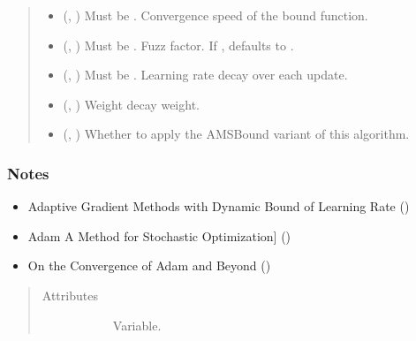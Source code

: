 \documentclass[letterpaper,10pt,english]{sphinxmanual}
\begin{document}
\begin{fulllineitems}
\begin{quote}
\begin{description}
\begin{itemize}
\item {} 
 (, ) \textendash{} Must be . Convergence speed of the bound function.

\item {} 
 (, ) \textendash{} Must be . Fuzz factor. If , defaults to .

\item {} 
 (, ) \textendash{} Must be . Learning rate decay over each update.

\item {} 
 (, ) \textendash{} Weight decay weight.

\item {} 
 (, ) \textendash{} Whether to apply the AMSBound variant of this algorithm.

\end{itemize}

\end{description}\end{quote}
\subsubsection*{Notes}
\begin{itemize}
\item {} 
Adaptive Gradient Methods with Dynamic Bound of Learning Rate ()

\item {} 
Adam \sphinxhyphen{} A Method for Stochastic Optimization{]} ()

\item {} 
On the Convergence of Adam and Beyond ()

\end{itemize}
\begin{quote}\begin{description}
\item[{Attributes}] \leavevmode\begin{description}
\item[{}] \leavevmode
Variable.


\end{description}
\end{description}
\end{quote}
\end{fulllineitems}
\end{document}

